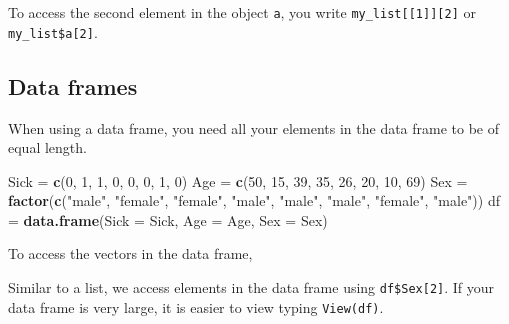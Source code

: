 \documentclass[]{article}
\newenvironment{Shaded}{\begin{snugshade}}{\end{snugshade}}
\newcommand{\KeywordTok}[1]{\textcolor[rgb]{0.13,0.29,0.53}{\textbf{#1}}}
\newcommand{\DataTypeTok}[1]{\textcolor[rgb]{0.13,0.29,0.53}{#1}}
\newcommand{\DecValTok}[1]{\textcolor[rgb]{0.00,0.00,0.81}{#1}}
\newcommand{\StringTok}[1]{\textcolor[rgb]{0.31,0.60,0.02}{#1}}
\newcommand{\OperatorTok}[1]{\textcolor[rgb]{0.81,0.36,0.00}{\textbf{#1}}}
\newcommand{\NormalTok}[1]{#1}
\begin{document}
To access the second element in the object \texttt{a}, you write
\texttt{my\_list{[}{[}1{]}{]}{[}2{]}} or \texttt{my\_list\$a{[}2{]}}.

\subsection{Data frames}\label{data-frames}

When using a data frame, you need all your elements in the data frame to
be of equal length.

\begin{Shaded}
\begin{Highlighting}[]
\NormalTok{Sick =}\StringTok{ }\KeywordTok{c}\NormalTok{(}\DecValTok{0}\NormalTok{, }\DecValTok{1}\NormalTok{, }\DecValTok{1}\NormalTok{, }\DecValTok{0}\NormalTok{, }\DecValTok{0}\NormalTok{, }\DecValTok{0}\NormalTok{, }\DecValTok{1}\NormalTok{, }\DecValTok{0}\NormalTok{)}
\NormalTok{Age =}\StringTok{ }\KeywordTok{c}\NormalTok{(}\DecValTok{50}\NormalTok{, }\DecValTok{15}\NormalTok{, }\DecValTok{39}\NormalTok{, }\DecValTok{35}\NormalTok{, }\DecValTok{26}\NormalTok{, }\DecValTok{20}\NormalTok{, }\DecValTok{10}\NormalTok{, }\DecValTok{69}\NormalTok{)}
\NormalTok{Sex =}\StringTok{ }\KeywordTok{factor}\NormalTok{(}\KeywordTok{c}\NormalTok{(}\StringTok{"male"}\NormalTok{, }\StringTok{"female"}\NormalTok{, }\StringTok{"female"}\NormalTok{, }\StringTok{"male"}\NormalTok{, }\StringTok{"male"}\NormalTok{, }\StringTok{"male"}\NormalTok{, }\StringTok{"female"}\NormalTok{, }
    \StringTok{"male"}\NormalTok{))}
\NormalTok{df =}\StringTok{ }\KeywordTok{data.frame}\NormalTok{(}\DataTypeTok{Sick =}\NormalTok{ Sick, }\DataTypeTok{Age =}\NormalTok{ Age, }\DataTypeTok{Sex =}\NormalTok{ Sex)}
\end{Highlighting}
\end{Shaded}

To access the vectors in the data frame,

\begin{Shaded}
\end{Shaded}

Similar to a list, we access elements in the data frame using
\texttt{df\$Sex{[}2{]}}. If your data frame is very large, it is easier
to view typing \texttt{View(df)}.
\end{document}
